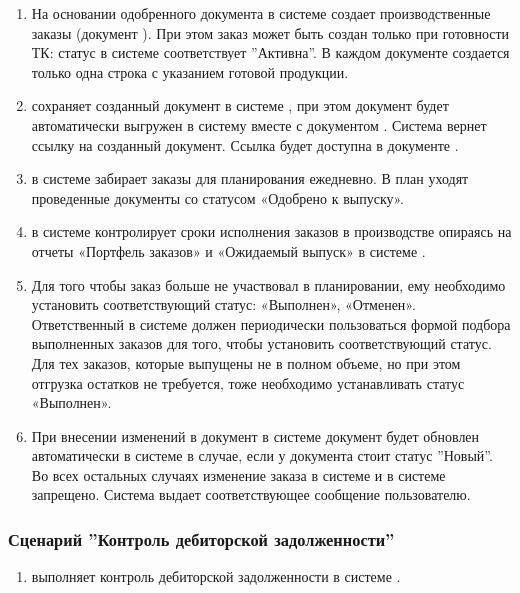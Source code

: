 \begin{enumerate}
\item	На основании одобренного документа  в системе \erp \manager создает производственные заказы (документ ).
При этом заказ может быть создан только при готовности ТК: статус  в системе \gofro соответствует ''Активна''.
В каждом документе создается только одна строка с указанием готовой продукции.

\item \manager сохраняет созданный документ  в системе \erp, при этом документ будет автоматически выгружен в систему \gofro вместе с документом . 
Система \gofro вернет ссылку на созданный документ. Ссылка будет доступна в документе . 

\item	\planner в системе \gofro забирает заказы для планирования ежедневно. В план уходят проведенные документы  со статусом «Одобрено к выпуску».
\item	\manager в системе \gofro контролирует сроки исполнения заказов в производстве опираясь на отчеты «Портфель заказов» и «Ожидаемый выпуск» в системе \gofro.
\item	Для того чтобы заказ больше не участвовал в планировании, ему необходимо установить соответствующий статус: «Выполнен», «Отменен». Ответственный \manager в системе \gofro должен периодически пользоваться формой подбора выполненных заказов для того, чтобы установить соответствующий статус. Для тех заказов, которые выпущены не в полном объеме, но при этом отгрузка остатков не требуется, тоже необходимо устанавливать статус «Выполнен».
\item При внесении изменений в документ  в системе \erp документ будет обновлен автоматически в системе \gofro в случае, если у документа стоит статус ''Новый''. Во всех остальных случаях изменение заказа в системе \gofro и в системе \erp запрещено. Система \erp  выдает соответствующее сообщение пользователю.
\end{enumerate}


\subsubsection{Сценарий ''Контроль дебиторской задолженности''}
\label{bp:sales_6}


\begin{enumerate}
\item	\manager выполняет контроль дебиторской задолженности в системе \erp.
\end{enumerate}

